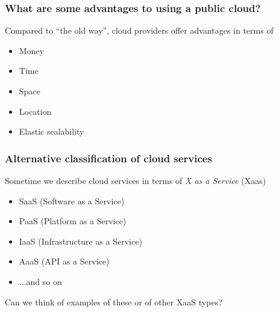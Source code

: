 \documentclass[10pt]{beamer}
\begin{document}
\begin{frame}
  \frametitle{What are some advantages to using a public cloud?}

  Compared to ``the old way'', cloud providers offer advantages in terms of 
  
	\begin{itemize}
    	\item Money
    	\item Time
    	\item Space
	    \item Location
	    \item Elastic scalability
  	\end{itemize}


\end{frame}

\begin{frame}
  \frametitle{Alternative classification of cloud services}
  
  Sometime we describe cloud services in terms of \emph{X as a Service} (Xaas)
  
  \begin{itemize}
    \item SaaS (Software as a Service)
    \item PaaS (Platform as a Service)
    \item IaaS (Infrastructure as a Service)
    \item AaaS (API as a Service)
    \item ...and so on
  \end{itemize}
  
  Can we think of examples of these or of other XaaS types?
\end{frame}
\end{document}
